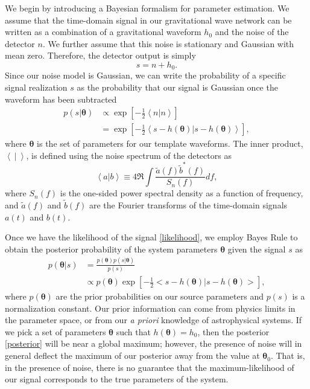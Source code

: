 \documentclass[11pt,a4paper]{emulateapj}
\begin{document}
We begin by introducing a Bayesian formalism for parameter estimation. 
We assume that the time-domain signal in our gravitational wave
network can be written as a combination of a gravitational
waveform $h_0$ and the noise of the detector $n$.  We further assume
that this noise is stationary and Gaussian with mean zero.  Therefore,
the detector output is simply
\begin{equation}
s = n + h_0 .
\label{SignalAddition}
\end{equation}
Since our noise model is Gaussian, we can write the
probability of a specific signal realization $s$ as the probability
that our signal is Gaussian once the waveform has been subtracted
\begin{align}
  p(s | \boldsymbol{\theta}) &\propto \exp\left[-\frac{1}{2}\left<n|n
    \right>\right] \nonumber \\ &= \exp\left[-\frac{1}{2}\left < s -
    h(\boldsymbol{\theta}) | s-h(\boldsymbol{\theta})\right >\right] ,
  \label{likelihood}
\end{align}
where $\boldsymbol{\theta}$ is the set of parameters for our template
waveforms.  The inner product, $\left< ~|~ \right> $, is defined using the noise
spectrum of the detectors as
\begin{equation}
  \left<a|b\right> \equiv 4 \Re \int \frac{\tilde{a}(f)\tilde{b}^*(f)}{S_n(f)} df ,
  \label{innerProduct}
\end{equation}
where $S_n(f)$ is the one-sided power spectral density as a function
of frequency, and $\tilde{a}(f)$ and $\tilde{b}(f)$ are the Fourier
transforms of the time-domain signals $a(t)$ and $b(t)$.
 
Once we have the likelihood of the signal \eqref{likelihood}, we
employ Bayes Rule to obtain the posterior probability of the system
parameters $\boldsymbol{\theta}$ given the signal $s$ as
\begin{align}
  p(\boldsymbol{\theta} | s) &= \frac{p(\boldsymbol{\theta})p(s | \boldsymbol{\theta})}{p(s)} \nonumber\\
  & \propto p(\boldsymbol{\theta}) \exp\left[-\frac{1}{2}\big < s - h(\boldsymbol{\theta}) | s-h(\boldsymbol{\theta}) \big > \right] ,
  \label{posterior}
\end{align}
where $p(\boldsymbol{\theta})$ are the prior probabilities on our
source parameters and $p(s)$ is a normalization constant.  Our prior
information can come from physics limits in the parameter space, or
from our \textit{a priori} knowledge of astrophysical systems. If we
pick a set of parameters $\boldsymbol{\theta}$ such that
$h(\boldsymbol{\theta}) = h_0$, then the posterior \eqref{posterior}
will be near a global maximum; however, the presence of noise will in
general deflect the maximum of our posterior away from the value at
$\boldsymbol{\theta}_0$. That is, in the presence of noise, there is
no guarantee that the maximum-likelihood of our signal corresponds to
the true parameters of the system.  
\end{document}
